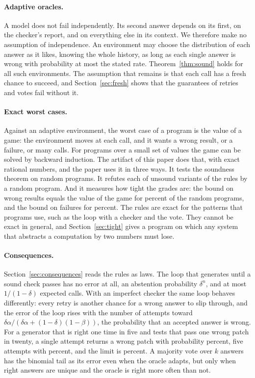 \documentclass[acmsmall,nonacm,screen]{acmart}
\begin{document}
\paragraph{Adaptive oracles.} A model does not fail independently. Its second answer depends
on its first, on the checker's report, and on everything else in its context. We therefore
make no assumption of independence. An environment may choose the distribution of each answer
as it likes, knowing the whole history, as long as each single answer is wrong with
probability at most the stated rate. Theorem~\ref{thm:sound} holds for all such environments.
The assumption that remains is that each call has a fresh chance to succeed, and
Section~\ref{sec:fresh} shows that the guarantees of retries and votes fail without it.

\paragraph{Exact worst cases.} Against an adaptive environment, the worst case of a program
is the value of a game: the environment moves at each call, and it wants a wrong result, or a
failure, or many calls. For programs over a small set of values the game can be solved by
backward induction. The artifact of this paper does that, with exact rational numbers, and
the paper uses it in three ways. It tests the soundness theorem on \exPrograms{} random
programs. It refutes each of \exRules{} unsound variants of the rules by a random program. And
it measures how tight the grades are: the bound on wrong results equals the value of the game
for \exTightBad{} percent of the random programs, and the bound on failures for \exTightFail{}
percent. The rules are exact for the patterns that programs use, such as the loop with a
checker and the vote. They cannot be exact in general, and Section~\ref{sec:tight} gives a
program on which any system that abstracts a computation by two numbers must lose.

\paragraph{Consequences.} Section~\ref{sec:consequences} reads the rules as laws. The loop
that generates until a sound check passes has no error at all, an abstention probability
$\delta^n$, and at most $1/(1-\delta)$ expected calls. With an imperfect checker the same loop
behaves differently: every retry is another chance for a wrong answer to slip through, and the
error of the loop rises with the number of attempts toward
$\delta\alpha / (\delta\alpha + (1-\delta)(1-\beta))$, the probability that an accepted answer
is wrong. For a generator that is right one time in five and tests that pass one wrong patch
in twenty, a single attempt returns a wrong patch with probability \exPatchOne{} percent, five
attempts with \exPatchFive{} percent, and the limit is \exPatchLimit{} percent. A majority
vote over $k$ answers has the binomial tail as its error even when the oracle adapts, but only
when right answers are unique and the oracle is right more often than not.
\end{document}
